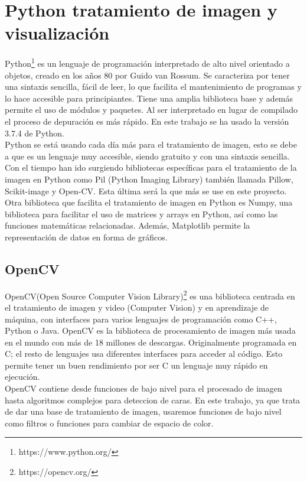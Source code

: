 \documentclass[a4paper,12pt]{report}
\begin{document}
\section{Python tratamiento de imagen y visualización}

Python\footnote{https://www.python.org/} es un lenguaje de programación interpretado de alto nivel orientado a objetos, creado en los años 80 por Guido van Rossum. Se caracteriza por tener una sintaxis sencilla, fácil de leer, lo que facilita el mantenimiento de programas y lo hace accesible para principiantes. Tiene una amplia biblioteca base y además permite el uso de módulos y paquetes. Al ser interpretado en lugar de compilado el proceso de depuración es más rápido. En este trabajo se ha usado la versión 3.7.4 de Python.\\

 Python se está usando cada día más para el tratamiento de imagen, esto se debe a que es un lenguaje muy accesible, siendo gratuito y con una sintaxis sencilla. Con el tiempo han ido surgiendo bibliotecas específicas para el tratamiento de la imagen en Python como Pil (Python Imaging Library) también llamada Pillow, Scikit-image y Open-CV. Esta última será la que más se use en este proyecto.\\

Otra biblioteca que facilita el tratamiento de imagen en Python es Numpy, una biblioteca para facilitar el uso de matrices y arrays en Python, así como las funciones matemáticas relacionadas.  Además, Matplotlib permite  la representación de datos en forma de gráficos.

\subsection{OpenCV}

OpenCV(Open Source Computer Vision Library)\footnote{https://opencv.org/} es una biblioteca centrada en el tratamiento de imagen y video (Computer Vision) y en aprendizaje de máquina, con interfaces para varios lenguajes de programación como C++, Python o Java. OpenCV es la biblioteca de procesamiento de imagen más usada en el mundo con más de 18 millones de descargas. Originalmente programada en C; el resto de lenguajes usa diferentes interfaces para acceder al código. Esto permite tener un buen rendimiento por ser C un lenguaje muy rápido en ejecución.\\

OpenCV contiene desde funciones de bajo nivel para el procesado de imagen hasta algoritmos complejos para deteccion de caras. En este trabajo, ya que trata de dar una base de tratamiento de imagen, usaremos funciones de bajo nivel como filtros o funciones para cambiar de espacio de color.\\
\end{document}
